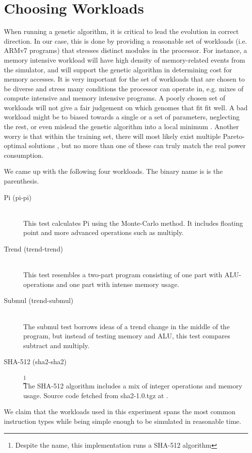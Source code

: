 \section{Choosing Workloads}

When running a genetic algorithm, it is critical to lead the evolution in
correct direction. In our case, this is done by providing a reasonable set of
workloads (i.e. ARMv7 programs) that stresses distinct modules in the processor.
For instance, a memory intensive workload will have high density of
memory-related events from the simulator, and will support the genetic algorithm
in determining cost for memory accesses. It is very important for the set of
workloads that are chosen to be diverse and stress many conditions the processor
can operate in, e.g. mixes of compute intensive and memory intensive programs.
A poorly chosen set of workloads will not give a fair judgement on which genomes
that fit fit well. A bad workload might be to biased towards a single or a set
of parameters, neglecting the rest, or even mislead the genetic algorithm into a
local minimum \cite{introtoga}. Another worry is that within the training set,
there will most likely exist multiple Pareto-optimal solutions
\cite{deb2014multi}, but no more than one of these can truly match the real
power consumption.

We came up with the following four workloads. The binary name is is the
parenthesis.

\begin{description}
    \item[Pi (pi-pi)] \hfill \\
        This test calculates Pi using the Monte-Carlo method. It includes
        floating point and more advanced operations such as multiply.
    \item[Trend (trend-trend)] \hfill \\
        This test resembles a two-part program consisting of
        one part with ALU-operations and one part with intense memory usage.
    \item[Submul (trend-submul)] \hfill \\
        The submul test borrows ideas of a trend change in the middle of
        the program, but instead of testing memory and ALU, this test compares
        subtract and multiply.
    \item[SHA-512 (sha2-sha2)]
        \footnote{Despite the name, this implementation runs a SHA-512
        algorithm} \hfill \\
        The SHA-512 algorithm includes a mix of integer operations and
        memory usage. Source code fetched from sha2-1.0.tgz at \cite{sha2}.
\end{description}

We claim that the workloads used in this experiment spans the most common
instruction types while being simple enough to be simulated in reasonable time.

